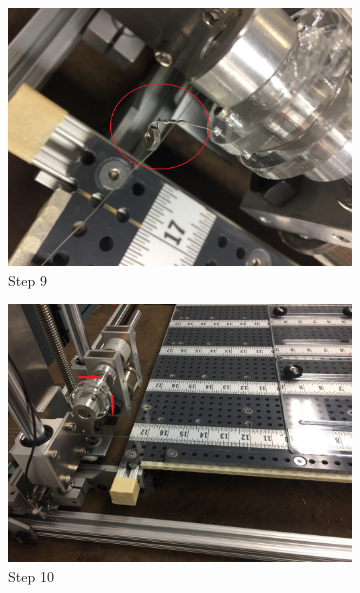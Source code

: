 \documentclass[titlepage,12pt,letter]{report}
\numberwithin{equation}{chapter}
\begin{document}
\begin{enumerate}[itemsep = 5pt,topsep=0pt]
\begin{figure}[H]
	\centering
	\begin{subfigure}[b]{.475\textwidth}
		\centering
		\includegraphics[width=\textwidth]{./Figures/Wire_mounting/9.jpg}
		\caption{Step 9}
	\end{subfigure}
	\begin{subfigure}[b]{.475\textwidth}
		\centering
		\includegraphics[width=\textwidth]{./Figures/Wire_mounting/10.jpg}
		\caption{Step 10}
	\end{subfigure}
	\centering
	\begin{subfigure}[b]{.475\textwidth}
		\centering

\end{subfigure}
\end{figure}
\end{enumerate}
\end{document}
